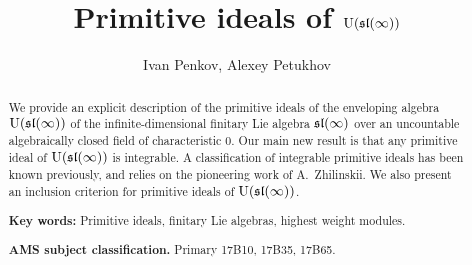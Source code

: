 \documentclass[10pt]{amsart}\oddsidemargin -1mm \evensidemargin -1mm \topmargin -15mm\headheight5mm \headsep 3.5mm \textheight 245mm\textwidth 170mm %
\begin{document}
\title{Primitive ideals of $\operatorname{\mathrm{U}}(\frak{sl}(\infty))$}
\author{Ivan Penkov, Alexey Petukhov}
\address{Ivan Penkov: Jacobs University Bremen, Campus Ring 1, D-28759, Bremen, Germany}
\address{Alexey Petukhov: The University of Manchester, Oxford Road M13 9PL, Manchester, UK, on leave from the Institute for Information Transmission Problems, Bolshoy Karetniy 19-1, Moscow 127994, Russia}
\maketitle

\begin{abstract}We provide an explicit description of the primitive ideals of the enveloping algebra $\operatorname{\mathrm{U}}(\frak{sl}(\infty))$ of the infinite-dimensional finitary Lie algebra $\frak{sl}(\infty)$ over an uncountable algebraically closed field of characteristic 0. Our main new result is that any primitive ideal of $\operatorname{\mathrm{U}}(\frak{sl}(\infty))$ is integrable. A classification of integrable primitive ideals has been known previously, and relies on the pioneering work of A.~Zhilinskii. We also present an inclusion criterion for primitive ideals of ${\rm U}(\frak{sl}(\infty))$.

{\bf Key words:} Primitive ideals, finitary Lie algebras, highest weight modules.

{\bf AMS subject classification.} Primary 17B10, 17B35, 17B65.
\end{abstract}
\end{document}
